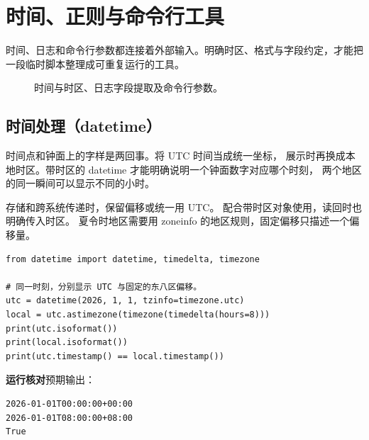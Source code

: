 \documentclass[UTF8,a4paper,oneside,openany,fontset=none,11pt]{ctexbook}
\newcommand{\code}[1]{\texttt{\detokenize{#1}}}
\begin{document}
\chapter{时间、正则与命令行工具}
\label{ch:11-outline}

时间、日志和命令行参数都连接着外部输入。明确时区、格式与字段约定，才能把一段临时脚本整理成可重复运行的工具。


\begin{figure}[htbp]
  \centering
  \caption*{时间与时区、日志字段提取及命令行参数。}
\end{figure}


\section[时间处理]{时间处理（datetime）}

时间点和钟面上的字样是两回事。将 UTC 时间当成统一坐标，
展示时再换成本地时区。带时区的 datetime 才能明确说明一个钟面数字对应哪个时刻，
两个地区的同一瞬间可以显示不同的小时。

存储和跨系统传递时，保留偏移或统一用 UTC。
\code{timestamp()} 配合带时区对象使用，读回时也明确传入时区。
夏令时地区需要用 zoneinfo 的地区规则，固定偏移只描述一个偏移量。


\begin{lstlisting}[title={\code{time_point.py}}]
from datetime import datetime, timedelta, timezone

# 同一时刻，分别显示 UTC 与固定的东八区偏移。
utc = datetime(2026, 1, 1, tzinfo=timezone.utc)
local = utc.astimezone(timezone(timedelta(hours=8)))
print(utc.isoformat())
print(local.isoformat())
print(utc.timestamp() == local.timestamp())
\end{lstlisting}


\textbf{运行核对}\enspace 预期输出：
\begin{lstlisting}[language={},numbers=none]
2026-01-01T00:00:00+00:00
2026-01-01T08:00:00+08:00
True
\end{lstlisting}
\end{document}
